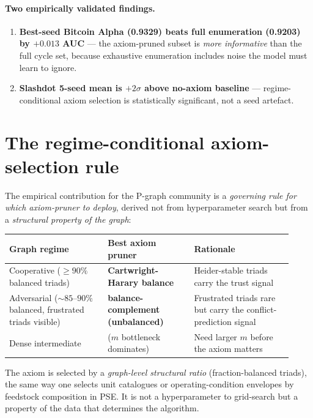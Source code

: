 \documentclass[11pt,a4paper]{article}
\begin{document}
\paragraph{Two empirically validated findings.}
\begin{enumerate}
  \item \textbf{Best-seed Bitcoin Alpha (0.9329) beats full enumeration
        (0.9203) by $+0.013$ AUC} --- the axiom-pruned subset is
        \emph{more informative} than the full cycle set, because
        exhaustive enumeration includes noise the model must learn
        to ignore.
  \item \textbf{Slashdot 5-seed mean is $+2\sigma$ above no-axiom
        baseline} --- regime-conditional axiom selection is
        statistically significant, not a seed artefact.
\end{enumerate}

\section{The regime-conditional axiom-selection rule}

The empirical contribution for the P-graph community is a
\emph{governing rule for which axiom-pruner to deploy}, derived
not from hyperparameter search but from a \emph{structural property of
the graph}:

\begin{center}\small
\begin{tabular}{p{0.32\linewidth} p{0.28\linewidth} p{0.32\linewidth}}
\toprule
Graph regime                   & Best axiom pruner            & Rationale \\
\midrule
Cooperative ($\geq 90\%$ balanced triads)      & \textbf{Cartwright-Harary balance}    & Heider-stable triads carry the trust signal \\
Adversarial ($\sim 85$--$90\%$ balanced, frustrated triads visible) & \textbf{balance-complement (unbalanced)} & Frustrated triads rare but carry the conflict-prediction signal \\
Dense intermediate             & ($m$ bottleneck dominates)   & Need larger $m$ before the axiom matters \\
\bottomrule
\end{tabular}
\end{center}

The axiom is selected by a \emph{graph-level structural ratio}
(fraction-balanced triads), the same way one selects unit catalogues
or operating-condition envelopes by feedstock composition in PSE.
It is not a hyperparameter to grid-search but a property of the data
that determines the algorithm.
\end{document}
